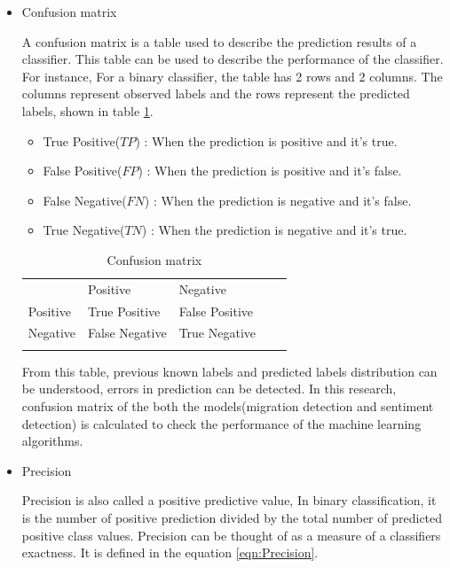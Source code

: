 \begin{itemize}
 \item Confusion matrix
 
 A confusion matrix is a table used to describe the prediction results of a classifier. This table can be used to describe the performance of the classifier. For instance, For a binary classifier, the table has 2 rows and 2 columns. The columns represent observed labels and the rows represent the predicted labels, shown in table \ref{tab:confusionmatrix}.
 
 \begin{itemize}
     \item True Positive($TP$) : When the prediction is positive and it’s true.
     \item False Positive($FP$) : When the prediction is positive and it’s false.
     \item False Negative($FN$) : When the prediction is negative and it’s false.
     \item True Negative($TN$) : When the prediction is negative and it’s true.
 \end{itemize}
 
\begin{table}[]
\centering
\begin{tabular}{lllll}
\cline{1-3}
\multicolumn{1}{|l|}{}   & \multicolumn{1}{l|}{Positive} & \multicolumn{1}{l|}{Negative}  &  &  \\ \cline{1-3}
\multicolumn{1}{|l|}{Positive} & \multicolumn{1}{l|}{True Positive}  & \multicolumn{1}{l|}{False Positive} &  &  \\ \cline{1-3}
\multicolumn{1}{|l|}{Negative}   & \multicolumn{1}{l|}{False Negative}  & \multicolumn{1}{l|}{True Negative}  &  &  \\ \cline{1-3}
                            &                           &                           &  & 
\end{tabular}
\caption{Confusion matrix}
\label{tab:confusionmatrix}
\end{table}
  From this table, previous known labels and predicted labels distribution can be understood, errors in prediction can be detected. In this research, confusion matrix of the both the models(migration detection and sentiment detection) is calculated to check the performance of the machine learning algorithms.
 
    \item Precision
    
    Precision is also called a positive predictive value, In binary classification, it is the number of positive prediction divided by the total number of predicted positive class values. Precision can be thought of as a measure of a classifiers exactness. It is defined in the equation \ref{eqn:Precision}. 
    

\end{itemize}

